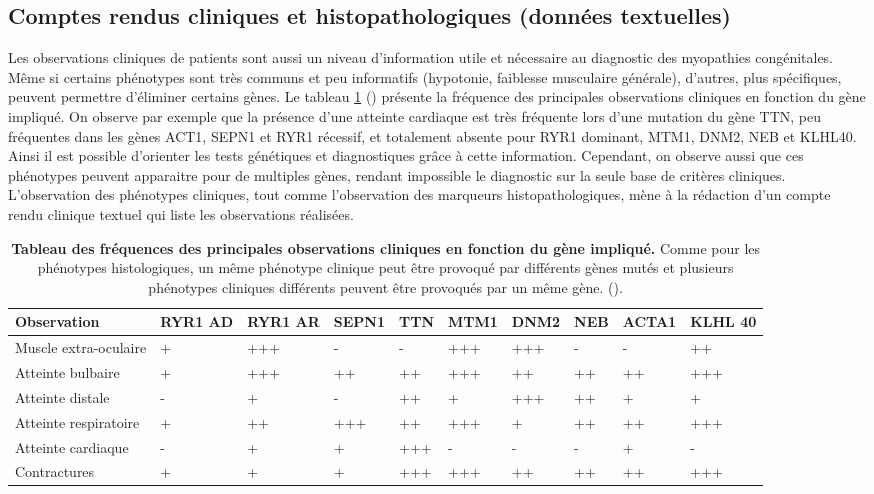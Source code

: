 \subsection{Comptes rendus cliniques et histopathologiques (données textuelles) }
Les observations cliniques de patients sont aussi un niveau d'information utile et nécessaire au diagnostic des myopathies congénitales. Même si certains phénotypes sont très communs et peu informatifs (hypotonie, faiblesse musculaire générale), d'autres, plus spécifiques, peuvent permettre d'éliminer certains gènes. Le tableau \ref{tab:clinic} (\cite{jungbluth_congenital_2018}) présente la fréquence des principales observations cliniques en fonction du gène impliqué. On observe par exemple que la présence d'une atteinte cardiaque est très fréquente lors d'une mutation du gène TTN, peu fréquentes dans les gènes ACT1, SEPN1 et RYR1 récessif, et totalement absente pour RYR1 dominant, MTM1, DNM2, NEB et KLHL40. Ainsi il est possible d'orienter les tests génétiques et diagnostiques grâce à cette information. Cependant, on observe aussi que ces phénotypes peuvent apparaitre pour de multiples gènes, rendant impossible le diagnostic sur la seule base de critères cliniques. L'observation des phénotypes cliniques, tout comme l'observation des marqueurs histopathologiques, mène à la rédaction d'un compte rendu clinique textuel qui liste les observations réalisées.

\begin{table}[!ht]
\begin{tabularx}{\textwidth}{|p{1.8cm}|X|X|X|X|X|X|X|X|X|}
 \hline
\textbf{Observation} & \textbf{RYR1 AD} & \textbf{RYR1 AR} & \textbf{SEPN1} & \textbf{TTN} & \textbf{MTM1} & \textbf{DNM2} & \textbf{NEB} & \textbf{ACTA1} & \textbf{KLHL 40} \\
\hline
Muscle extra-oculaire & + & +++ & - & - & +++ & +++ & - & - & ++ \\
\hline
Atteinte bulbaire & + & +++ & ++ & ++ & +++ & ++ & ++ & ++ & +++ \\
\hline
Atteinte distale & - & + & - & ++ & + & +++ & ++ & + & + \\
\hline
Atteinte respiratoire & + & ++ & +++ & ++ & +++ & + & ++ & ++ & +++ \\
\hline
Atteinte cardiaque & - & + & + & +++ & - & - & - & + & - \\
\hline
Contractures & + & + & + & +++ & +++ & ++ & ++ & ++ & +++ \\
\hline
\end{tabularx}
\caption[Tableau des fréquences des principales observations cliniques en fonction du gène impliqué]{\textbf{Tableau des fréquences des principales observations cliniques en fonction du gène impliqué.} Comme pour les phénotypes histologiques, un même phénotype clinique peut être provoqué par différents gènes mutés et plusieurs phénotypes cliniques différents peuvent être provoqués par un même gène. (\cite{jungbluth_congenital_2018}).}
\label{tab:clinic}
\end{table}

